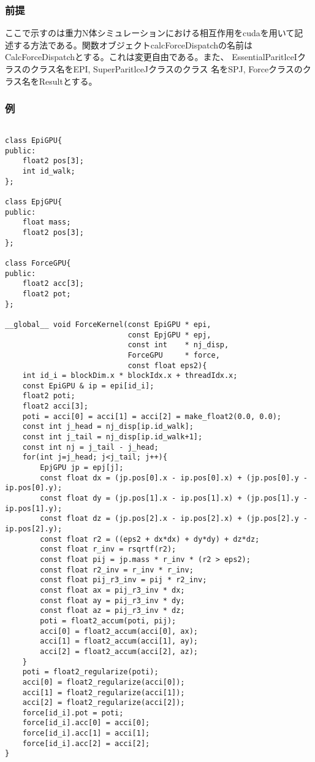 \subsubsection{前提}

ここで示すのは重力N体シミュレーションにおける相互作用をcudaを用いて記
述する方法である。関数オブジェクトcalcForceDispatchの名前は
CalcForceDispatchとする。これは変更自由である。また、
EssentialParitlceIクラスのクラス名をEPI, SuperParitlceJクラスのクラス
名をSPJ, Forceクラスのクラス名をResultとする。

\subsubsection{例}

\begin{lstlisting}[caption=calcForceDispatch]

class EpiGPU{
public:
    float2 pos[3];
    int id_walk;
};

class EpjGPU{
public:
    float mass;
    float2 pos[3];
};

class ForceGPU{
public:
    float2 acc[3];
    float2 pot;
};
  
__global__ void ForceKernel(const EpiGPU * epi,
                            const EpjGPU * epj, 
                            const int    * nj_disp,
                            ForceGPU     * force,
                            const float eps2){
    int id_i = blockDim.x * blockIdx.x + threadIdx.x;
    const EpiGPU & ip = epi[id_i];
    float2 poti;
    float2 acci[3];
    poti = acci[0] = acci[1] = acci[2] = make_float2(0.0, 0.0);
    const int j_head = nj_disp[ip.id_walk];
    const int j_tail = nj_disp[ip.id_walk+1];
    const int nj = j_tail - j_head;
    for(int j=j_head; j<j_tail; j++){
        EpjGPU jp = epj[j];
        const float dx = (jp.pos[0].x - ip.pos[0].x) + (jp.pos[0].y - ip.pos[0].y);
        const float dy = (jp.pos[1].x - ip.pos[1].x) + (jp.pos[1].y - ip.pos[1].y);
        const float dz = (jp.pos[2].x - ip.pos[2].x) + (jp.pos[2].y - ip.pos[2].y);
        const float r2 = ((eps2 + dx*dx) + dy*dy) + dz*dz;
        const float r_inv = rsqrtf(r2);
        const float pij = jp.mass * r_inv * (r2 > eps2); 
        const float r2_inv = r_inv * r_inv; 
        const float pij_r3_inv = pij * r2_inv; 
        const float ax = pij_r3_inv * dx; 
        const float ay = pij_r3_inv * dy;
        const float az = pij_r3_inv * dz;
        poti = float2_accum(poti, pij);
        acci[0] = float2_accum(acci[0], ax);
        acci[1] = float2_accum(acci[1], ay);
        acci[2] = float2_accum(acci[2], az);
    }
    poti = float2_regularize(poti);
    acci[0] = float2_regularize(acci[0]);
    acci[1] = float2_regularize(acci[1]);
    acci[2] = float2_regularize(acci[2]);
    force[id_i].pot = poti;
    force[id_i].acc[0] = acci[0];
    force[id_i].acc[1] = acci[1];
    force[id_i].acc[2] = acci[2];
}


\end{lstlisting}
